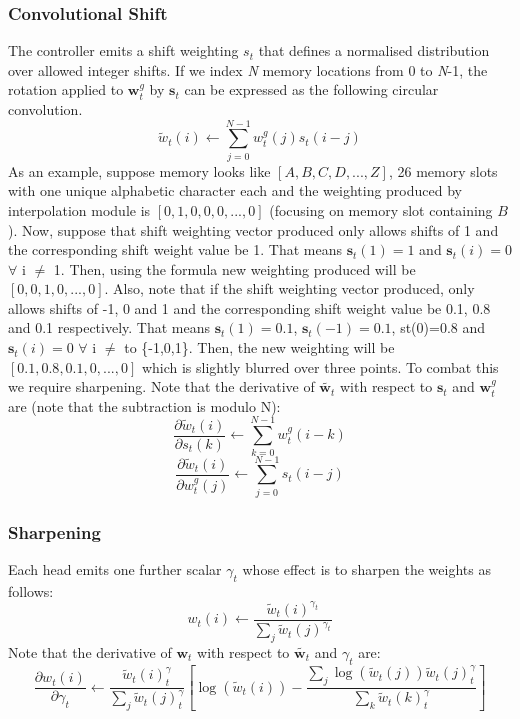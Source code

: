 \subsubsection{Convolutional Shift}
The controller emits a shift weighting $s_t$ that defines a normalised distribution over allowed integer shifts. If we index \textit{N} memory locations from 0 to \textit{N}-1, the rotation applied to $\textbf{w}_t^g$ by $\textbf{s}_t$ can be expressed as the following circular convolution.
\begin{equation}
\widetilde{w}_t(i) \leftarrow \sum_{j=0}^{N-1} w_t^g(j)s_t(i-j)
\end{equation}
\noindent
As an example, suppose memory looks like ${[A,B,C,D,...,Z]}$, 26 memory slots with one unique alphabetic character each and the weighting produced by interpolation module is ${[0,1,0,0,0,...,0]}$ (focusing on memory slot containing ${B}$). Now, suppose that shift weighting vector produced only allows shifts of 1 and the corresponding shift weight value be 1. That means $\textbf{s}_t(1)=1$ and $\textbf{s}_t(i)=0$ $\forall$ i $\neq$ 1. Then, using the formula new weighting produced will be ${[0,0,1,0,...,0]}$. Also, note that if the shift weighting vector produced, only allows shifts of -1, 0 and 1 and the corresponding shift weight value be 0.1, 0.8 and 0.1 respectively. That means $\textbf{s}_t(1)=0.1$, $\textbf{s}_t(-1)=0.1$, st(0)=0.8 and $\textbf{s}_t(i)=0$ $\forall$ i $\neq$ to \{-1,0,1\}. Then, the new weighting will be ${[0.1,0.8,0.1,0,...,0]}$ which is slightly blurred over three points. To combat this we require sharpening. Note that the derivative of $\widetilde{\textbf{w}_t}$ with respect to $\textbf{s}_t$ and $\textbf{w}_t^g$ are (note that the subtraction is modulo N): 
\begin{equation}
\frac{\partial \widetilde{w}_t(i)}{\partial s_t(k)} \leftarrow \sum_{k=0}^{N-1} w_t^g(i-k)
\end{equation}
\begin{equation}
\frac{\partial \widetilde{w}_t(i)}{\partial w_t^g(j)} \leftarrow \sum_{j=0}^{N-1} s_t(i-j)
\end{equation}

\subsubsection{Sharpening}
Each head emits one further scalar $\gamma_t$ whose effect is to sharpen the weights as follows:
\begin{equation}
w_t(i) \leftarrow \frac{\widetilde{w}_t(i)^{\gamma_t}}{\sum_{j} \widetilde{w}_t(j)^{\gamma_t}}
\end{equation}
\noindent
Note that the derivative of $\textbf{w}_t$ with respect to $\widetilde{\textbf{w}_t}$ and $\gamma_t$ are:
\begin{equation}
\frac{\partial w_t(i)}{\partial \gamma_t} \leftarrow \frac{\widetilde{w}_t(i)^\gamma_t}{\sum_{j}\widetilde{w}_t(j)^\gamma_t}\left [ \log(\widetilde{w}_t(i)) - \frac{\sum_{j} \log(\widetilde{w}_t(j))\widetilde{w}_t(j)^\gamma_t}{\sum_{k}\widetilde{w}_t(k)^\gamma_t} \right ]
\end{equation}

